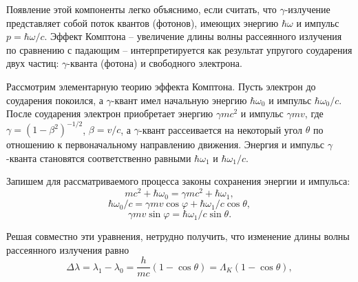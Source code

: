 \documentclass[a4paper,12pt]{article}
\begin{document}
Появление этой компоненты легко объяснимо, если считать, что $\gamma$-излучение представляет собой поток квантов (фотонов), имеющих энергию $\hbar\omega$ и импульс $p = \hbar\omega / c$. Эффект Комптона -- увеличение длины волны рассеянного излучения по сравнению с падающим -- интерпретируется как результат упругого соударения двух частиц: $\gamma$-кванта (фотона) и свободного электрона.

Рассмотрим элементарную теорию эффекта Комптона. Пусть электрон до соударения покоился,
а $\gamma$-квант имел начальную энергию $\hbar\omega_0$ и импульс $\hbar\omega_0 / c$. После соударения электрон приобретает энергию $\gamma mc^2$ и импульс $\gamma mv$, где $\gamma = (1 - \beta^2)^{-1 / 2}$, $\beta = v/c$, а $\gamma$-квант рассеивается на некоторый угол $\theta$ по отношению к первоначальному направлению движения. Энергия и импульс $\gamma$-кванта становятся соответственно равными $\hbar\omega_1$ и $\hbar\omega_1 / c$.

Запишем для рассматриваемого процесса законы сохранения энергии
и импульса:
\begin{equation}\label{eq: Energy conservation law}
    mc^2 + \hbar\omega_0 = \gamma mc^2 + \hbar\omega_1, 
\end{equation}
\begin{equation}\label{eq: Impulse oX conservation law}
    \hbar\omega_0 / c = \gamma mv\cos\varphi + \hbar\omega_1 / c \cos\theta, 
\end{equation}
\begin{equation}\label{eq: Impulse oY conservation law}
    \gamma mv\sin\varphi = \hbar\omega_1 / c \sin\theta. 
\end{equation}

Решая совместно эти уравнения, нетрудно получить, что изменение длины волны
рассеянного излучения равно
\begin{equation}\label{eq: Wave length difference}
    \Delta\lambda = \lambda_1 - \lambda_0 = \frac{h}{mc}(1 - \cos\theta) = \Lambda_K(1 - \cos\theta),
\end{equation}
\end{document}
